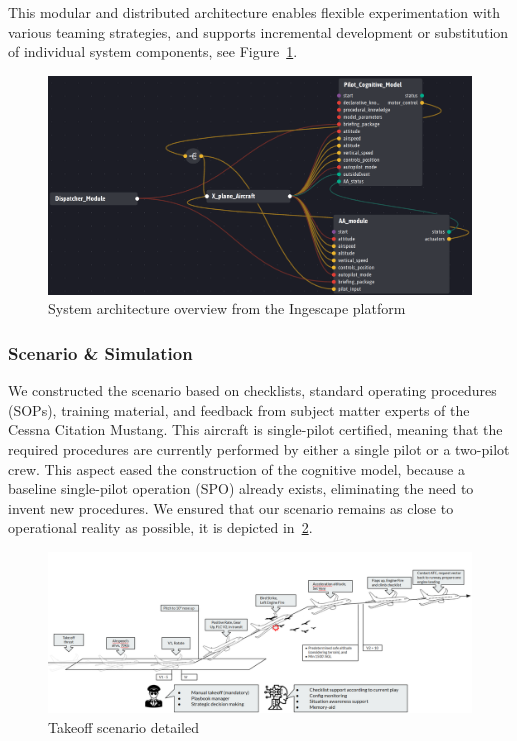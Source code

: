 \documentclass[12pt,a4paper]{article} %
\begin{document}
	This modular and distributed architecture enables flexible experimentation with various teaming strategies, and supports incremental development or substitution of individual system components, see Figure~\ref{fig:ingescape_platform}.
	
	\begin{figure}[H] 
		\centering
		\includegraphics[width=1.0\textwidth]{./images/ingescape_platform.png}
		\caption{System architecture overview from the Ingescape platform}
		\label{fig:ingescape_platform}
	\end{figure}
	

	\subsubsection{Scenario \& Simulation}
	We constructed the scenario based on checklists, standard operating procedures (SOPs), training material, and feedback from subject matter experts of the Cessna Citation Mustang. This aircraft is single-pilot certified, meaning that the required procedures are currently performed by either a single pilot or a two-pilot crew. This aspect eased the construction of the cognitive model, because a baseline single-pilot operation (SPO) already exists, eliminating the need to invent new procedures. We ensured that our scenario remains as close to operational reality as possible, it is depicted in~\ref{fig:scenario_detailed}.

	\begin{figure}[H]
		\centering
		\includegraphics[width=1.0\textwidth]{./images/scenario_detailed.png}
		\caption{Takeoff scenario detailed}
		\label{fig:scenario_detailed}
	\end{figure}
\end{document}
